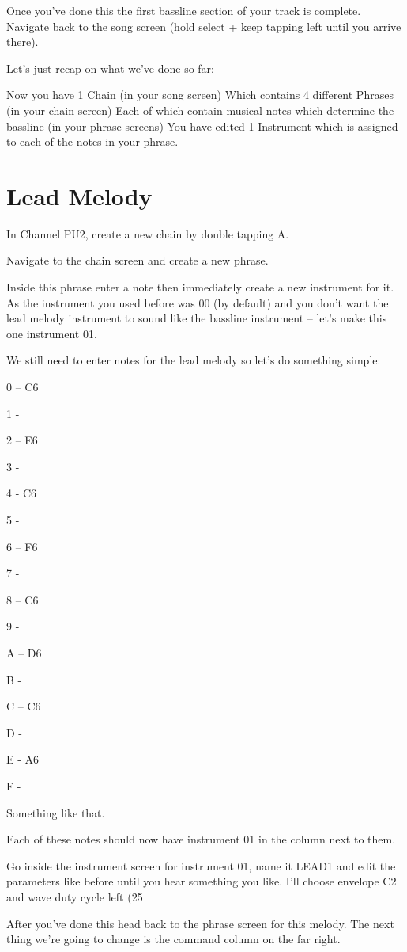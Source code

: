 \documentclass[]{article}
\begin{document}
Once you’ve done this the first bassline section of your track is complete. Navigate back to the song screen (hold select + keep tapping left until you arrive there).

Let’s just recap on what we’ve done so far:

Now you have 1 Chain (in your song screen) Which contains 4 different Phrases (in your chain screen) Each of which contain musical notes which determine the bassline (in your phrase screens) You have edited 1 Instrument which is assigned to each of the notes in your phrase.

\section{Lead Melody}
In Channel PU2, create a new chain by double tapping A.

Navigate to the chain screen and create a new phrase.

Inside this phrase enter a note then immediately create a new instrument for it. As the instrument you used before was 00 (by default) and you don’t want the lead melody instrument to sound like the bassline instrument – let’s make this one instrument 01.

We still need to enter notes for the lead melody so let’s do something simple:

0 – C6

1 -

2 – E6

3 -

4 - C6

5 -

6 – F6

7 -

8 – C6

9 -

A – D6

B -

C – C6

D -

E - A6

F -


Something like that.

Each of these notes should now have instrument 01 in the column next to them.

Go inside the instrument screen for instrument 01, name it LEAD1 and edit the parameters like before until you hear something you like. I’ll choose envelope C2 and wave duty cycle left (25%

After you’ve done this head back to the phrase screen for this melody. The next thing we’re going to change is the command column on the far right.
\end{document}
